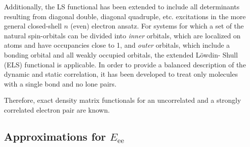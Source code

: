 \begin{enumerate}
        Additionally, the LS functional has been extended to include all 
        determinants resulting from diagonal double, diagonal quadruple, etc. 
        excitations in the more general closed-shell $n$ (even) electron ansatz.
        For systems for which a set of the natural spin-orbitals can be divided 
        into \textit{inner} orbitals, which are localized on atoms and have 
        occupancies close to 1, and \textit{outer} orbitals, which include a 
        bonding orbital and all weakly occupied orbitals, the extended Löwdin-
        Shull (ELS) functional is 
        applicable.
        In order to provide a balanced description of the dynamic and static 
        correlation, it has been developed to treat only molecules with a 
        single bond and no lone pairs.

\end{enumerate}

Therefore, exact density matrix functionals for an uncorrelated and a strongly
correlated electron pair are known.

\subsection{Approximations for $E_{\text{ee}}$} %

